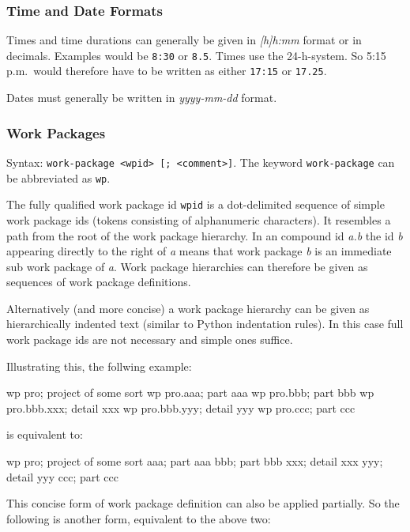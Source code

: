 \documentclass[11pt]{article}
\begin{document}
\subsubsection{Time and Date Formats}

Times and time durations can generally be given in \emph{[h]h:mm} format or in decimals. Examples would be \verb-8:30- or \verb-8.5-. Times use the 24-h-system. So 5:15 p.m.\ would therefore have to be written as either \verb-17:15- or \verb-17.25-.

Dates must generally be written in \emph{yyyy-mm-dd} format.

\subsubsection{Work Packages}

Syntax: \verb:work-package <wpid> [; <comment>]:.
The keyword \verb:work-package: can be abbreviated as \verb:wp:.

The fully qualified work package id \verb:wpid: is a dot-delimited sequence of simple work package ids (tokens consisting of alphanumeric characters). It resembles a path from the root of the work package hierarchy. In an compound id \emph{a.b} the id \emph{b} appearing directly to the right of \emph{a} means that work package \emph{b} is an immediate sub work package of \emph{a}. Work package hierarchies can therefore be given as sequences of work package definitions.

Alternatively (and more concise) a work package hierarchy can be given as hierarchically indented text (similar to Python indentation rules). In this case full work package ids are not necessary and simple ones suffice.

Illustrating this, the follwing example:

\begin{inputfile}
wp pro; project of some sort
wp pro.aaa; part aaa
wp pro.bbb; part bbb
wp pro.bbb.xxx; detail xxx
wp pro.bbb.yyy; detail yyy
wp pro.ccc; part ccc
\end{inputfile}

is equivalent to:

\begin{inputfile}
wp pro; project of some sort
    aaa; part aaa
    bbb; part bbb
        xxx; detail xxx
        yyy; detail yyy
    ccc; part ccc
\end{inputfile}

This concise form of work package definition can also be applied partially. So the following is another form, equivalent to the above two:
\end{document}
